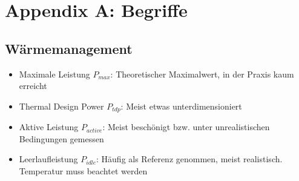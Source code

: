 \section{Appendix A: Begriffe}

\subsection{Wärmemanagement}
\begin{itemize}
	\item Maximale Leistung \(P_{max}\): Theoretischer Maximalwert, in der Praxis kaum erreicht
	\item Thermal Design Power \(P_{tdp}\): Meist etwas unterdimensioniert
	\item Aktive Leistung \(P_{active}\): Meist beschönigt bzw. unter unrealistischen Bedingungen gemessen
	\item Leerlaufleistung \(P_{idle}\): Häufig als Referenz genommen, meist realistisch. Temperatur muss beachtet werden
\end{itemize}